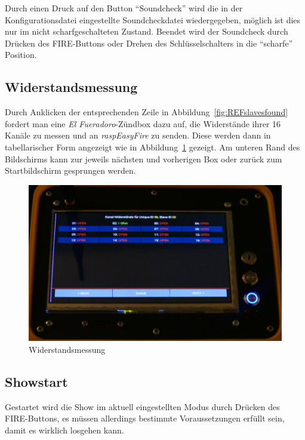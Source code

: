 \documentclass[paper=a4, parskip, numbers=noenddot, toc=listof, headsepline]{scrbook}
\newcommand{\anlage}{\emph{El Fueradoro}}
\newcommand{\REF}{\emph{raspEasyFire}}
\begin{document}
				Durch einen Druck auf den Button \enquote{Soundcheck} wird die in der Konfigurationsdatei eingestellte Soundcheckdatei wiedergegeben, möglich ist dies nur im nicht scharfgeschalteten Zustand. Beendet wird der Soundcheck durch Drücken des FIRE-Buttons oder Drehen des Schlüsselschalters in die \enquote{scharfe} Position.

			\subsection{Widerstandsmessung}

				Durch Anklicken der entsprechenden Zeile in Abbildung~\ref{fig:REFslavesfound} fordert man eine {\anlage}-Zündbox dazu auf, die Widerstände ihrer 16 Kanäle zu messen und an {\REF} zu senden. Diese werden dann in tabellarischer Form angezeigt wie in Abbildung~\ref{fig:REFimpedances} gezeigt. Am unteren Rand des Bildschirms kann zur jeweils nächsten und vorherigen Box oder zurück zum Startbildschirm gesprungen werden.

				\begin{figure}
					\centering\includegraphics[width=150mm]{Bilder/REFimpedances}
					\caption{Widerstandsmessung}
					\label{fig:REFimpedances}
				\end{figure}

			\subsection{Showstart}

				Gestartet wird die Show im aktuell eingestellten Modus durch Drücken des FIRE-Buttons, es müssen allerdings bestimmte Voraussetzungen erfüllt sein, damit es wirklich losgehen kann.
\end{document}
